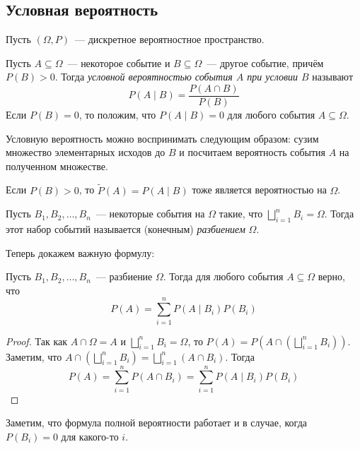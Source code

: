 \documentclass[a4paper,12pt]{article}
\begin{document}
\subsection{Условная вероятность}
Пусть \((\Omega, P)\)~--- дискретное вероятностное пространство.
\begin{definition}
	Пусть \(A \subseteq \Omega\)~--- некоторое событие и \(B \subseteq \Omega\)~--- другое событие, причём \(P(B) > 0\). Тогда \emph{условной вероятностью события \(A\) при условии \(B\)} называют \[P(A \mid B) = \frac{P(A \cap B)}{P(B)}\]
	Если \(P(B) = 0\), то положим, что \(P(A \mid B) = 0\) для любого события \(A \subseteq \Omega\).
\end{definition}
Условную вероятность можно воспринимать следующим образом: сузим множество элементарных исходов до \(B\) и посчитаем вероятность события \(A\) на полученном множестве.
\begin{remark}
	Если \(P(B) > 0\), то \(\tilde{P}(A) = P(A \mid B)\) тоже является вероятностью на \(\Omega\).
\end{remark}
\begin{definition}
	Пусть \(B_1, B_2, \ldots, B_n\)~--- некоторые события на \(\Omega\) такие, что \(\bigsqcup\limits_{i = 1}^{n} B_i = \Omega\). Тогда этот набор событий называется (конечным) \emph{разбиением} \(\Omega\).
\end{definition}
Теперь докажем важную формулу:
\begin{law-of-total-probability}
	Пусть \(B_1, B_2, \ldots, B_n\)~--- разбиение \(\Omega\). Тогда для любого события \(A \subseteq \Omega\) верно, что \[P(A) = \sum\limits_{i = 1}^{n} P(A \mid B_i)P(B_i)\]
\end{law-of-total-probability}
\begin{proof}
	Так как \(A \cap \Omega = A\) и \(\bigsqcup\limits_{i = 1}^{n} B_i = \Omega\), то \(P(A) = P\left(A \cap \left(\bigsqcup\limits_{i = 1}^{n} B_i\right)\right)\). Заметим, что \(A \cap \left(\bigsqcup\limits_{i = 1}^{n} B_i\right) = \bigsqcup\limits_{i = 1}^{n} (A \cap B_i)\). Тогда
	\[P(A) = \sum_{i = 1}^{n} P(A \cap B_i) = \sum\limits_{i = 1}^{n} P(A \mid B_i)P(B_i)\]
\end{proof}
Заметим, что формула полной вероятности работает и в случае, когда \(P(B_i) = 0\) для какого-то \(i\).
\end{document}
